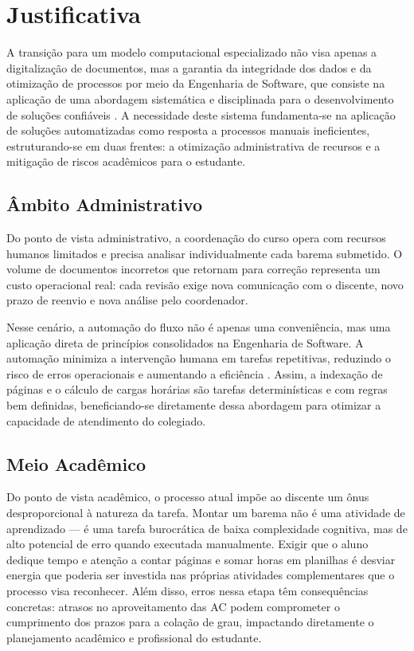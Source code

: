 \chapter{Justificativa}
\label{cap:justificativa}
A transição para um modelo computacional especializado não visa apenas a digitalização de documentos, mas a garantia da integridade dos dados e da otimização de processos por meio da Engenharia de Software, que consiste na aplicação de uma abordagem sistemática e disciplinada para o desenvolvimento de soluções confiáveis \cite{pressman2016}. A necessidade deste sistema fundamenta-se na aplicação de soluções automatizadas como resposta a processos manuais ineficientes, estruturando-se em duas frentes: a otimização administrativa de recursos e a mitigação de riscos acadêmicos para o estudante.

\section{Âmbito Administrativo}

Do ponto de vista administrativo, a coordenação do curso opera com recursos humanos limitados e precisa analisar individualmente cada barema submetido. O volume de documentos incorretos que retornam para correção representa um custo operacional real: cada revisão exige nova comunicação com o discente, novo prazo de reenvio e nova análise pelo coordenador. 

Nesse cenário, a automação do fluxo não é apenas uma conveniência, mas uma aplicação direta de princípios consolidados na Engenharia de Software. A automação minimiza a intervenção humana em tarefas repetitivas, reduzindo o risco de erros operacionais e aumentando a eficiência \cite{abidemi2024role}. Assim, a indexação de páginas e o cálculo de cargas horárias são tarefas determinísticas e com regras bem definidas, beneficiando-se diretamente dessa abordagem para otimizar a capacidade de atendimento do colegiado.

\section{Meio Acadêmico}

Do ponto de vista acadêmico, o processo atual impõe ao discente um ônus desproporcional à natureza da tarefa. Montar um barema não é uma atividade de aprendizado — é uma tarefa burocrática de baixa complexidade cognitiva, mas de alto potencial de erro quando executada manualmente. Exigir que o aluno dedique tempo e atenção a contar páginas e somar horas em planilhas é desviar energia que poderia ser investida nas próprias atividades complementares que o processo visa reconhecer. Além disso, erros nessa etapa têm consequências concretas: atrasos no aproveitamento das AC podem comprometer o cumprimento dos prazos para a colação de grau, impactando diretamente o planejamento acadêmico e profissional do estudante.

